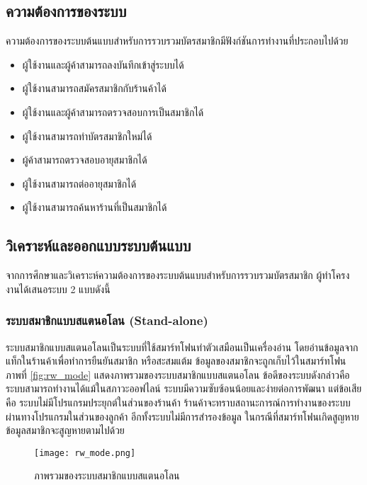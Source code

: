 \documentclass[a4paper]{article}
\begin{document}
\subsection{ความต้องการของระบบ}
ความต้องการของระบบต้นแบบสำหรับการรวบรวมบัตรสมาชิกมีฟังก์ชันการทำงานที่ประกอบไปด้วย
\begin{itemize}
	\item ผู้ใช้งานและผู้ค้าสามารถลงบันทึกเข้าสู่ระบบได้
	\item ผู้ใช้งานสามารถสมัครสมาชิกกับร้านค้าได้
	\item ผู้ใช้งานและผู้ค้าสามารถตรวจสอบการเป็นสมาชิกได้
	\item ผู้ใช้งานสามารถทำบัตรสมาชิกใหม่ได้
	\item ผู้ค้าสามารถตรวจสอบอายุสมาชิกได้
	\item ผู้ใช้งานสามารถต่ออายุสมาชิกได้
	\item ผู้ใช้งานสามารถค้นหาร้านที่เป็นสมาชิกได้
\end{itemize}

\subsection{วิเคราะห์และออกแบบระบบต้นแบบ}

จากการศึกษาและวิเคราะห์ความต้องการของระบบต้นแบบสำหรับการรวบรวมบัตรสมาชิก ผู้ทำโครงงานได้เสนอระบบ 2 แบบดังนี้

\subsubsection{ระบบสมาชิกแบบสแตนอโลน (Stand-alone)}
ระบบสมาชิกแบบสแตนอโลนเป็นระบบที่ใช้สมาร์ทโฟนทำตัวเสมือนเป็นเครื่องอ่าน โดยอ่านข้อมูลจากแท็กในร้านค้าเพื่อทำการยืนยันสมาชิก หรือสะสมแต้ม ข้อมูลของสมาชิกจะถูกเก็บไว้ในสมาร์ทโฟน ภาพที่ \ref{fig:rw_mode} แสดงภาพรวมของระบบสมาชิกแบบสแตนอโลน ข้อดีของระบบดังกล่าวคือ ระบบสามารถทำงานได้แม้ในสภาวะออฟไลน์ ระบบมีความซับซ้อนน้อยและง่ายต่อการพัฒนา แต่ข้อเสียคือ ระบบไม่มีโปรแกรมประยุกต์ในส่วนของร้านค้า ร้านค้าจะทราบสถานะการณ์การทำงานของระบบผ่านทางโปรแกรมในส่วนของลูกค้า อีกทั้งระบบไม่มีการสำรองข้อมูล ในกรณีที่สมาร์ทโฟนเกิดสูญหาย ข้อมูลสมาชิกจะสูญหายตามไปด้วย

\begin{figure}[ht!]
\centering
\texttt{[image: rw\_mode.png]}
\caption{ภาพรวมของระบบสมาชิกแบบสแตนอโลน} \label{fig:rw_mode}
\label{overflow}
\end{figure}
\end{document}
